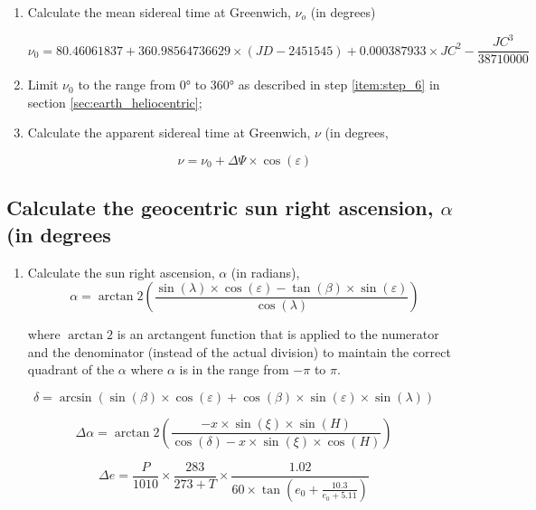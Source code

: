 \documentclass{article}
\begin{document}
\begin{enumerate}
\item Calculate the mean sidereal time at Greenwich, $\nu_o$ (in
  degrees)

  \begin{equation}
    \label{eq:nu_0}
    \nu_0 = 80.46061837 + 360.98564736629 \times (JD - 2451545) + 0.000387933 \times JC^2 - \frac{JC^3}{38710000}
  \end{equation}

\item Limit $\nu_0$ to the range from \ang{0} to \ang{360} as described
  in step \ref{item:step_6} in section \ref{sec:earth_heliocentric};

\item Calculate the apparent sidereal time at Greenwich, $\nu$ (in
  degrees,

  \begin{equation}
    \label{eq:nu}
    \nu = \nu_0 + \Delta\Psi \times \cos(\varepsilon)
  \end{equation}
\end{enumerate}

\subsection{Calculate the geocentric sun right ascension, $\alpha$ (in
  degrees}

\begin{enumerate}
\item Calculate the sun right ascension, $\alpha$ (in radians),
  \begin{equation}
    \label{eq:alpha}
    \alpha = \arctan2\left(\frac{\sin(\lambda) \times \cos(\varepsilon) - \tan(\beta) \times \sin(\varepsilon)}{\cos(\lambda)}\right)
  \end{equation}

  \par where $\arctan2$ is an arctangent function that is applied to the
  numerator and the denominator (instead of the actual division) to
  maintain the correct quadrant of the $\alpha$ where $\alpha$ is in the range
  from $-\pi$ to $\pi$.
\end{enumerate}

\begin{equation}
  \label{eq:delta}
  \delta = \arcsin\left(\sin(\beta) \times \cos(\varepsilon) + \cos(\beta) \times \sin(\varepsilon) \times \sin(\lambda)\right)
\end{equation}

\begin{equation}
  \label{eq:delta_alpha}
  \Delta\alpha = \arctan2\left(\frac{-x \times \sin(\xi) \times \sin(H)}{\cos(\delta) - x \times \sin(\xi) \times \cos(H)}\right)
\end{equation}

\begin{equation}
  \label{eq:delta_e}
  \Delta e = \frac{P}{1010}\times\frac{283}{273 + T} \times \frac{1.02}{60 \times \tan\left(e_0 + \frac{10.3}{e_0 + 5.11}\right)}
\end{equation}

\appendix

\printindex



\end{document}
